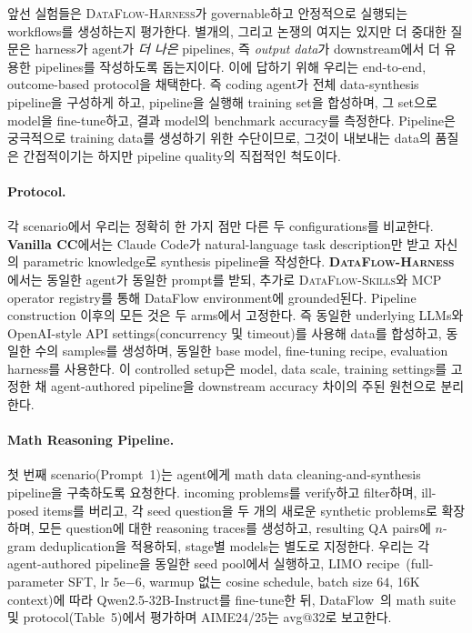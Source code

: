 앞선 실험들은 \textsc{DataFlow-Harness}가 governable하고 안정적으로 실행되는 workflows를 생성하는지 평가한다. 별개의, 그리고 논쟁의 여지는 있지만 더 중대한 질문은 harness가 agent가 \emph{더 나은} pipelines, 즉 \emph{output data}가 downstream에서 더 유용한 pipelines를 작성하도록 돕는지이다. 이에 답하기 위해 우리는 end-to-end, outcome-based protocol을 채택한다. 즉 coding agent가 전체 data-synthesis pipeline을 구성하게 하고, pipeline을 실행해 training set을 합성하며, 그 set으로 model을 fine-tune하고, 결과 model의 benchmark accuracy를 측정한다. Pipeline은 궁극적으로 training data를 생성하기 위한 수단이므로, 그것이 내보내는 data의 품질은 간접적이기는 하지만 pipeline quality의 직접적인 척도이다.

\paragraph{\textbf{Protocol.}}
각 scenario에서 우리는 정확히 한 가지 점만 다른 두 configurations를 비교한다. \textbf{Vanilla CC}에서는 Claude Code가 natural-language task description만 받고 자신의 parametric knowledge로 synthesis pipeline을 작성한다. \textbf{\textsc{DataFlow-Harness}}에서는 동일한 agent가 동일한 prompt를 받되, 추가로 \textsc{DataFlow-Skills}와 MCP operator registry를 통해 DataFlow environment에 grounded된다. Pipeline construction 이후의 모든 것은 두 arms에서 고정한다. 즉 동일한 underlying LLMs와 OpenAI-style API settings(concurrency 및 timeout)를 사용해 data를 합성하고, 동일한 수의 samples를 생성하며, 동일한 base model, fine-tuning recipe, evaluation harness를 사용한다. 이 controlled setup은 model, data scale, training settings를 고정한 채 agent-authored pipeline을 downstream accuracy 차이의 주된 원천으로 분리한다.

\paragraph{\textbf{Math Reasoning Pipeline.}}
첫 번째 scenario(Prompt~1)는 agent에게 math data cleaning-and-synthesis pipeline을 구축하도록 요청한다. incoming problems를 verify하고 filter하며, ill-posed items를 버리고, 각 seed question을 두 개의 새로운 synthetic problems로 확장하며, 모든 question에 대한 reasoning traces를 생성하고, resulting QA pairs에 $n$-gram deduplication을 적용하되, stage별 models는 별도로 지정한다. 우리는 각 agent-authored pipeline을 동일한 seed pool에서 실행하고, LIMO recipe~\cite{ye2025limo}(full-parameter SFT, lr $5\mathrm{e}{-6}$, warmup 없는 cosine schedule, batch size $64$, 16K context)에 따라 Qwen2.5-32B-Instruct를 fine-tune한 뒤, DataFlow~\cite{dataflow2025}의 math suite 및 protocol(Table~5)에서 평가하며 AIME24/25는 avg@32로 보고한다.


